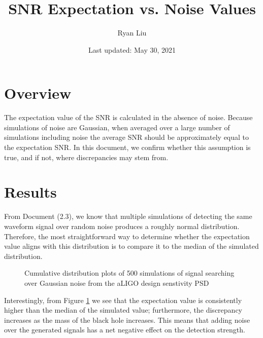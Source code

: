 \documentclass{article}
\title{SNR Expectation vs. Noise Values}
\author{Ryan Liu}
\date{Last updated: May 30, 2021}
\begin{document}
\maketitle

\section{Overview}

The expectation value of the SNR is calculated in the absence of noise. Because simulations of noise are Gaussian, when averaged over a large number of simulations including noise the average SNR should be approximately equal to the expectation SNR. In this document, we confirm whether this assumption is true, and if not, where discrepancies may stem from. 

\section{Results}

From Document (2.3), we know that multiple simulations of detecting the same waveform signal over random noise produces a roughly normal distribution. Therefore, the most straightforward way to determine whether the expectation value aligns with this distribution is to compare it to the median of the simulated distribution.

\begin{figure}[!htb]
    \caption{\label{fig:cdf} Cumulative distribution plots of 500 simulations of signal searching over Gaussian noise from the aLIGO design senstivity PSD}
\end{figure}

Interestingly, from Figure \ref{fig:cdf} we see that the expectation value is consistently higher than the median of the simulated value; furthermore, the discrepancy increases as the mass of the black hole increases. This means that adding noise over the generated signals has a net negative effect on the detection strength. \\
\end{document}
